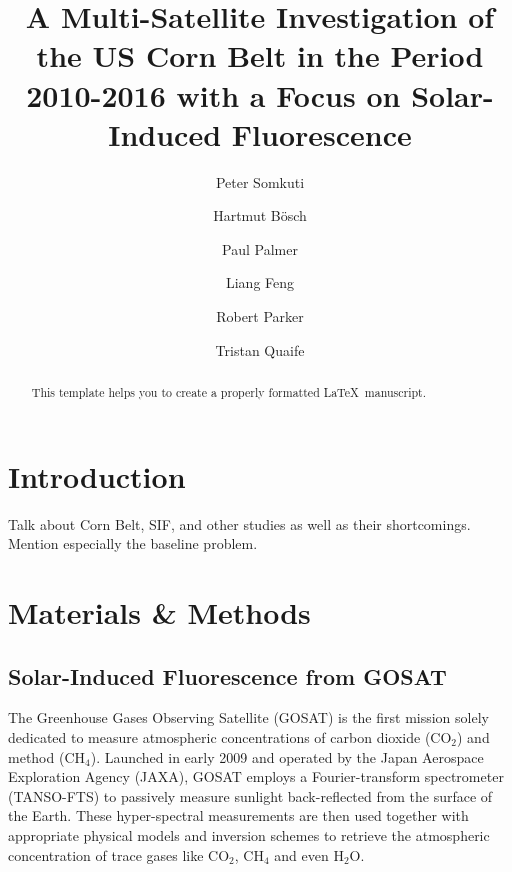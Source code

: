 \documentclass[preprint, a4paper, 10pt, times]{elsarticle}
\begin{document}
\begin{frontmatter}

\title{A Multi-Satellite Investigation of the US Corn Belt in the Period 2010-2016 with a Focus on Solar-Induced Fluorescence}

\author[uol,nceo]{Peter Somkuti}
\author[uol,nceo]{Hartmut B\"osch}
\author[uoe,nceo]{Paul Palmer}
\author[uoe,nceo]{Liang Feng}
\author[uol,nceo]{Robert Parker}
\author[nceo]{Tristan Quaife}





\address[uol]{University of Leicester, Department of Physics of Astronomy, Leicester, UK}
\address[nceo]{National Centre for Earth Observation, University of Leicester, Leicester, UK}
\address[uoe]{University of Edinburgh, Edinburgh, UK}

\begin{abstract}
This template helps you to create a properly formatted \LaTeX\ manuscript.
\end{abstract}

\end{frontmatter}
\linenumbers

\section{Introduction}

Talk about Corn Belt, SIF, and other studies as well as their shortcomings. Mention especially the baseline problem.

\section{Materials \& Methods}
\subsection{Solar-Induced Fluorescence from GOSAT}
\label{sec:GOSAT_SIF}

The Greenhouse Gases Observing Satellite (GOSAT) is the first mission solely dedicated to measure atmospheric concentrations of carbon dioxide (CO$_2$) and method (CH$_4$). Launched in early 2009 and operated by the Japan Aerospace Exploration Agency (JAXA), GOSAT employs a Fourier-transform spectrometer (TANSO-FTS) to passively measure sunlight back-reflected from the surface of the Earth. These hyper-spectral measurements are then used together with appropriate physical models and inversion schemes to retrieve the atmospheric concentration of trace gases like CO$_2$, CH$_4$ and even H$_2$O.
\end{document}
